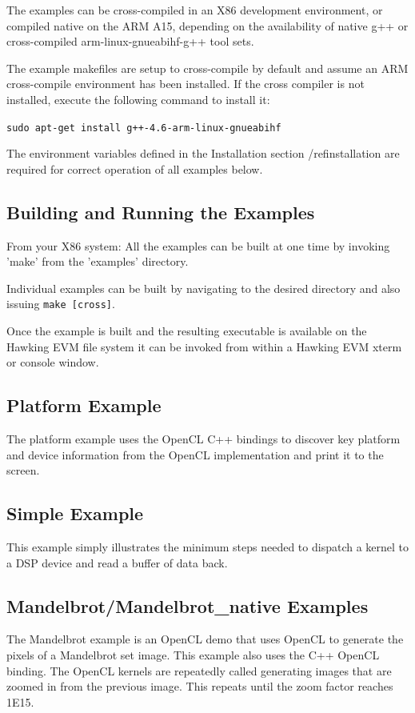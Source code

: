\documentclass[10pt]{article}
\begin{document}
The examples can be cross-compiled in an X86 development environment, or 
compiled native on the ARM A15, depending on the availability of native g++ or
cross-compiled arm-linux-gnueabihf-g++ tool sets.

The example makefiles are setup to cross-compile by default and
assume an ARM cross-compile environment has been installed. If the cross compiler is not installed, execute the following command to install it:

\texttt{sudo apt-get install g++-4.6-arm-linux-gnueabihf}

The environment variables defined in the Installation section
/ref{installation} are required for
correct operation of all examples below.

\subsection{Building and Running the Examples}
From your X86 system: All the examples can be built at one time by invoking 
'make' from the 'examples' directory.

Individual examples can be built by navigating to the desired directory and also
issuing \texttt{make [cross]}.

Once the example is built and the resulting executable is available on the
Hawking EVM file system it can be invoked from within a Hawking EVM xterm
or console window. 


\subsection{Platform Example}\label{platform}
The platform example uses the OpenCL C++ bindings to discover key platform and
device information from the OpenCL implementation and print it to the screen.


\subsection{Simple Example}
This example simply illustrates the minimum steps needed to dispatch a kernel
to a DSP device and read a buffer of data back.


\subsection{Mandelbrot/Mandelbrot\_native Examples}\label{mandelbrot}
The Mandelbrot example is an OpenCL demo that uses OpenCL to generate the
pixels of a Mandelbrot set image.  This example also uses the C++ OpenCL 
binding.  The OpenCL kernels are repeatedly called generating images that are 
zoomed in from the previous image.  This repeats until the zoom factor reaches 
1E15. 
\end{document}
